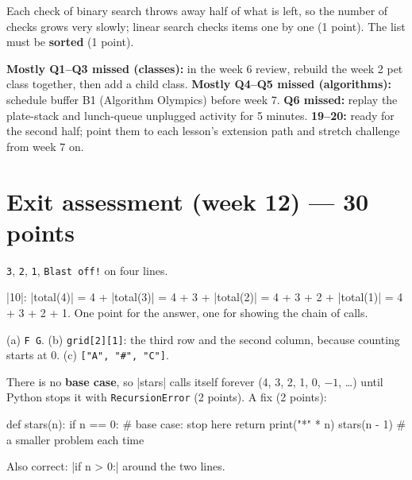 \begin{answer}
Each check of binary search throws away half of what is left, so the number of checks grows very
slowly; linear search checks items one by one (1 point). The list must be \textbf{sorted} (1 point).
\end{answer}

\begin{rubric}
\textbf{Mostly Q1--Q3 missed (classes):} in the week 6 review, rebuild the week 2 pet class
together, then add a child class. \textbf{Mostly Q4--Q5 missed (algorithms):} schedule buffer B1
(Algorithm Olympics) before week 7. \textbf{Q6 missed:} replay the plate-stack and lunch-queue
unplugged activity for 5 minutes. \textbf{19--20:} ready for the second half; point them to each lesson's extension path and
stretch challenge from week 7 on.
\end{rubric}

\section{Exit assessment (week 12) --- 30 points}

\begin{answer}
\texttt{3}, \texttt{2}, \texttt{1}, \texttt{Blast off!} on four lines.
\end{answer}

\begin{answer}
\py|10|: \py|total(4)| = 4 + \py|total(3)| = 4 + 3 + \py|total(2)| = 4 + 3 + 2 + \py|total(1)| =
4 + 3 + 2 + 1. One point for the answer, one for showing the chain of calls.
\end{answer}

\begin{answer}
(a) \texttt{F G}. (b) \texttt{grid[2][1]}: the third row and the second column, because counting starts at 0. (c)
\texttt{["A", "\#", "C"]}.
\end{answer}

\begin{answer}
There is no \textbf{base case}, so \py|stars| calls itself forever (4, 3, 2, 1, 0, $-1$, \ldots)
until Python stops it with \texttt{RecursionError} (2 points). A fix (2 points):
\begin{pycode}
def stars(n):
    if n == 0:          # base case: stop here
        return
    print("*" * n)
    stars(n - 1)        # a smaller problem each time
\end{pycode}
Also correct: \py|if n > 0:| around the two lines.
\end{answer}

